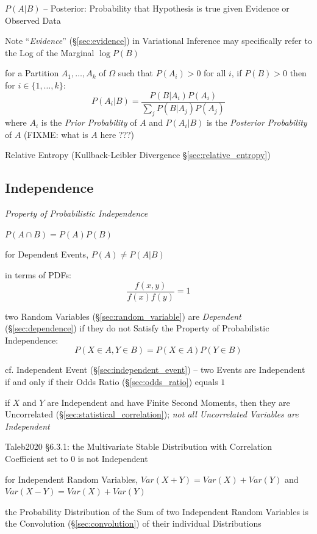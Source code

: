$P(A|B)$ -- Posterior: Probability that Hypothesis is true given Evidence or
Observed Data

Note ``\emph{Evidence}'' (\S\ref{sec:evidence}) in Variational Inference may
specifically refer to the Log of the Marginal $\log P(B)$

for a Partition $A_1, \ldots, A_k$ of $\Omega$ such that $P(A_i) > 0$ for all
$i$, if $P(B) > 0$ then for $i \in \{1, \ldots, k\}$:
\[
  P(A_i|B) = \frac{
    P(B|A_i)P(A_i)
  }{
    \sum_j P(B|A_j)P(A_j)
  }
\]
where $A_i$ is the \emph{Prior Probability} of $A$ and $P(A_i|B)$ is the
\emph{Posterior Probability} of $A$ (FIXME: what is $A$ here ???)

\fist Relative Entropy (Kullback-Leibler Divergence
\S\ref{sec:relative_entropy})



\subsection{Independence}\label{sec:independence}

\emph{Property of Probabilistic Independence}

$P(A \cap B) = P(A)P(B)$

for Dependent Events, $P(A) \neq P(A|B)$

in terms of PDFs:
\[
  \frac{f(x,y)}{f(x) f(y)} = 1
\]

two Random Variables (\S\ref{sec:random_variable}) are \emph{Dependent}
(\S\ref{sec:dependence}) if they do not Satisfy the Property of
Probabilistic Independence:
\[
  P(X \in A, Y \in B) = P(X \in A) P(Y \in B)
\]

\fist cf. Independent Event (\S\ref{sec:independent_event}) --
two Events are Independent if and only if their Odds Ratio
(\S\ref{sec:odds_ratio}) equals $1$

if $X$ and $Y$ are Independent and have Finite Second Moments, then they are
Uncorrelated (\S\ref{sec:statistical_correlation}); \emph{not all Uncorrelated
Variables are Independent}

Taleb2020 \S 6.3.1: the Multivariate Stable Distribution with Correlation
Coefficient set to $0$ is not Independent

for Independent Random Variables, $Var(X + Y) = Var(X) + Var(Y)$ and
$Var(X - Y) = Var(X) + Var(Y)$

the Probability Distribution of the Sum of two Independent Random Variables is
the Convolution (\S\ref{sec:convolution}) of their individual Distributions

